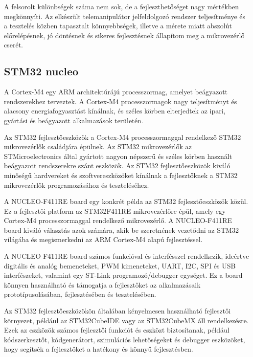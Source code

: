 A felsorolt különbségek száma nem sok, de a fejleszthetőséget nagy mértékben megkönnyíti. Az elkészült telemanipulátor jelfeldolgozó rendszer teljesítménye és a tesztelés közben tapasztalt könnyebbségek, illetve a mérete miatt abszolút előrelépésnek, jó döntésnek és sikeres fejlesztésnek állapítom meg a mikrovezérlő cserét.


\subsection{STM32 nucleo}
\label{sec:STM32_nucleo}
A Cortex-M4 egy ARM architektúrájú processzormag, amelyet beágyazott rendszerekhez terveztek. A Cortex-M4 processzormagok nagy teljesítményt és alacsony energiafogyasztást kínálnak, és széles körben elterjedtek az ipari, gyártási és beágyazott alkalmazások területén.

Az STM32 fejlesztőeszközök a Cortex-M4 processzormaggal rendelkező STM32 mikrovezérlők családjára épülnek. Az STM32 mikrovezérlők az STMicroelectronics által gyártott nagyon népszerű és széles körben használt beágyazott rendszerekre szánt eszközök. Az STM32 fejlesztőeszközök kiváló minőségű hardvereket és szoftvereszközöket kínálnak a fejlesztőknek a STM32 mikrovezérlők programozásához és teszteléséhez.

A NUCLEO-F411RE board egy konkrét példa az STM32 fejlesztőeszközök közül. Ez a fejlesztői platform az STM32F411RE mikrovezérlőre épül, amely egy Cortex-M4 processzormaggal rendelkező mikrovezérlő. A NUCLEO-F411RE board kiváló választás azok számára, akik be szeretnének vezetődni az STM32 világába és megismerkedni az ARM Cortex-M4 alapú fejlesztéssel.

A NUCLEO-F411RE board számos funkcióval és interfésszel rendelkezik, ideértve digitális és analóg bemeneteket, PWM kimeneteket, UART, I2C, SPI és USB interfészeket, valamint egy ST-Link programozó/debugger egységet. Ez a board könnyen használható és támogatja a fejlesztőket az alkalmazásaik prototípusolásában, fejlesztésében és tesztelésében.

Az STM32 fejlesztőeszközökön általában kényelmesen használható fejlesztői környezet, például az STM32CubeIDE vagy az STM32CubeMX áll rendelkezésre. Ezek az eszközök számos fejlesztői funkciót és eszközt biztosítanak, például kódszerkesztőt, kódgenerátort, szimulációs lehetőségeket és debugger eszközöket, hogy segítsék a fejlesztőket a hatékony és könnyű fejlesztésben.

